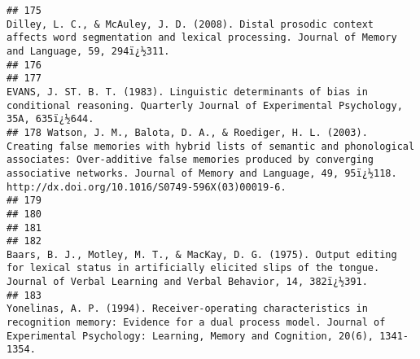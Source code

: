 \documentclass[
  english,
  man]{apa6}
\begin{document}
\begin{verbatim}
## 175                                                                                                                                                    Dilley, L. C., & McAuley, J. D. (2008). Distal prosodic context affects word segmentation and lexical processing. Journal of Memory and Language, 59, 294ï¿½311.
## 176                                                                                                                                                                                                                                                                                                                    
## 177                                                                                                                                                                 EVANS, J. ST. B. T. (1983). Linguistic determinants of bias in conditional reasoning. Quarterly Journal of Experimental Psychology, 35A, 635ï¿½644.
## 178 Watson, J. M., Balota, D. A., & Roediger, H. L. (2003). Creating false memories with hybrid lists of semantic and phonological associates: Over-additive false memories produced by converging associative networks. Journal of Memory and Language, 49, 95ï¿½118. http://dx.doi.org/10.1016/S0749-596X(03)00019-6.
## 179                                                                                                                                                                                                                                                                                                                    
## 180                                                                                                                                                                                                                                                                                                                    
## 181                                                                                                                                                                                                                                                                                                                    
## 182                                                                                                                 Baars, B. J., Motley, M. T., & MacKay, D. G. (1975). Output editing for lexical status in artificially elicited slips of the tongue. Journal of Verbal Learning and Verbal Behavior, 14, 382ï¿½391.
## 183                                                                                                         Yonelinas, A. P. (1994). Receiver-operating characteristics in recognition memory: Evidence for a dual process model. Journal of Experimental Psychology: Learning, Memory and Cognition, 20(6), 1341-1354.

\end{verbatim}
\end{document}
